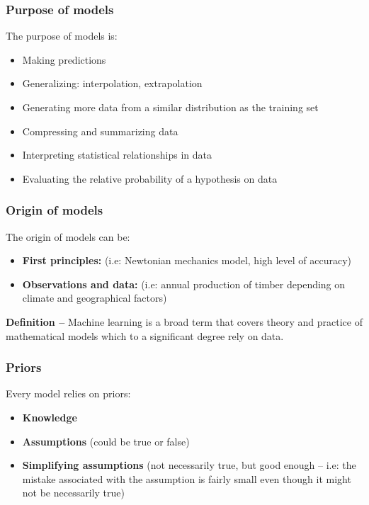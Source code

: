 \documentclass[a4paper,11pt]{article}
\begin{document}
	\subsubsection{Purpose of models}
	The purpose of models is:
	\begin{itemize}
		\item Making predictions
		\item Generalizing: interpolation, extrapolation
		\item Generating more data from a similar distribution as the training set
		\item Compressing and summarizing data
		\item Interpreting statistical relationships in data
		\item Evaluating the relative probability of a hypothesis on data
	\end{itemize}
	\subsubsection{Origin of models}
	The origin of models can be:
	\begin{itemize}
		\item \textbf{First principles:}  (i.e: Newtonian mechanics model, high level of accuracy)
		\item \textbf{Observations and data:} (i.e: annual production of timber depending on climate and geographical factors)
	\end{itemize}
	\textbf{Definition --} Machine learning is a broad term that covers theory and practice of mathematical models which to a significant degree rely on data.
	\subsubsection{Priors}
	Every model relies on priors: 
	\begin{itemize}
		\item \textbf{Knowledge}
		\item \textbf{Assumptions} (could be true or false)
		\item \textbf{Simplifying assumptions} (not necessarily true, but good enough -- i.e:  the mistake associated with the assumption is fairly small even though it might not be necessarily true)
	\end{itemize}
\end{document}
